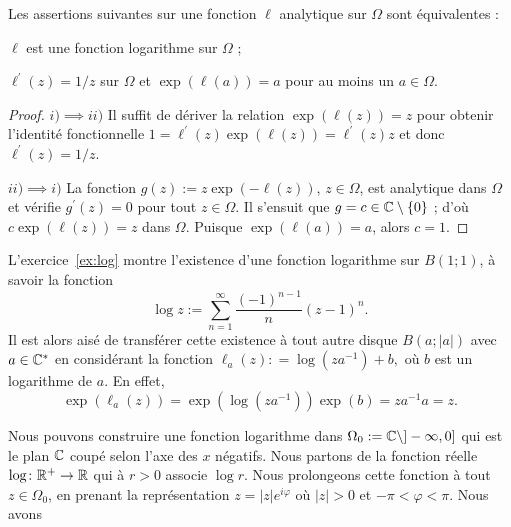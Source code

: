\begin{prop}
Les assertions suivantes sur une fonction $\ell$ analytique sur $\Omega$ sont équivalentes :
\begin{MYenumerate}
\item $\ell$ est une fonction logarithme sur $\Omega$ ;
\item $\ell^\prime(z)=1/z$ sur $\Omega$ et $\exp(\ell(a))=a$ pour au moins un $a \in \Omega$.
\end{MYenumerate}
\end{prop}

\begin{proof}
$i) \implies ii)$ Il suffit de dériver la relation $\exp(\ell(z))=z$ pour obtenir l'identité fonctionnelle $1=\ell^\prime(z) \exp (\ell(z))=\ell^\prime(z) z$ et donc $\ell^\prime(z)=1/z$.

$ii) \implies i)$ La fonction $g(z) := z \exp(-\ell(z))$, $z \in \Omega$, est analytique dans $\Omega$ et vérifie $g^\prime(z)=0$ pour tout $z \in \Omega$. Il s'ensuit que $g =c \in \mathbb{C} \setminus\{0\}$ ; d'où $c \exp(\ell(z))=z$ dans $\Omega$. Puisque $\exp(\ell(a))=a$, alors $c=1$.
\end{proof}

L'exercice~\ref{ex:log} montre l'existence d'une fonction logarithme sur $B(1;1)$, à savoir la fonction
\[\log z := \sum_{n=1}^\infty  \frac{(-1)^{n-1}}{n}(z-1)^n.\]
Il est alors aisé de transférer cette existence à tout autre disque $B(a ;\lvert a \rvert)$ avec $a \in \mathbb{C}^\ast$ en considérant la fonction $\ell_a(z) : =\log(z a^{-1}) + b,$ où $b$ est un logarithme de $a$. En effet,
\[\exp(\ell_a(z))=\exp(\log(z a^{-1})) \exp(b)=z a^{-1}a=z.\]

Nous pouvons construire une fonction logarithme dans $\Omega_0 := \mathbb{C} \setminus ]-\infty,0]$ qui est le plan $\mathbb{C}$ coupé selon l'axe des $x$ négatifs. Nous partons de la fonction réelle $\log \colon \mathbb R^+ \to \mathbb R$ qui à $r>0$ associe $\log r$. Nous prolongeons cette fonction à tout $z \in \Omega_0$, en prenant la représentation $z=\lvert z\rvert e^{i  \varphi}$ où $\lvert z\rvert>0$ et $-\pi< \varphi < \pi$. Nous avons

